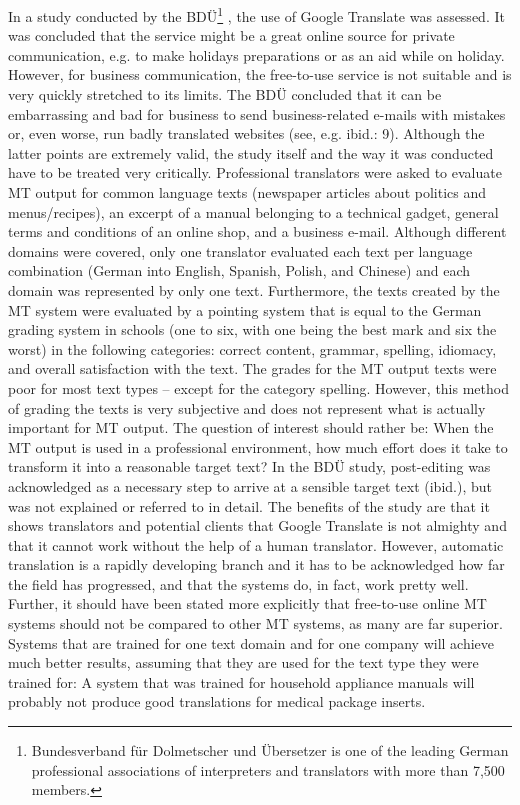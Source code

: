 \documentclass[output=paper]{langsci/langscibook}
\begin{document}
In a study conducted by the BDÜ\footnote{Bundesverband für Dolmetscher und Übersetzer is one of the leading German professional associations of interpreters and translators with more than 7,500 members.} \citep{bdü2012}, the use of Google Translate was assessed. It was concluded that the service might be a great online source for private communication, e.g. to make holidays preparations or as an aid while on holiday. However, for business communication, the free-to-use service is not suitable and is very quickly stretched to its limits. The BDÜ concluded that it can be embarrassing and bad for business to send business-related e\nobreakdash-mails with mistakes or, even worse, run badly translated websites (see, e.g. ibid.: 9). Although the latter points are extremely valid, the study itself and the way it was conducted have to be treated very critically. Professional translators were asked to evaluate MT output for common language texts (newspaper articles about politics and menus/recipes), an excerpt of a manual belonging to a technical gadget, general terms and conditions of an online shop, and a business e\nobreakdash-mail. Although different domains were covered, only one translator evaluated each text per language combination (German into English, Spanish, Polish, and Chinese) and each domain was represented by only one text. Furthermore, the texts created by the MT system were evaluated by a pointing system that is equal to the German grading system in schools (one to six, with one being the best mark and six the worst) in the following categories: correct content, grammar, spelling, idiomacy, and overall satisfaction with the text. The grades for the MT output texts were poor for most text types -- except for the category spelling. However, this method of grading the texts is very subjective and does not represent what is actually important for MT output. The question of interest should rather be: When the MT output is used in a professional environment, how much effort does it take to transform it into a reasonable target text? In the BDÜ study, post-editing was acknowledged as a necessary step to arrive at a sensible target text (ibid.), but was not explained or referred to in detail. The benefits of the study are that it shows translators and potential clients that Google Translate is not almighty and that it cannot work without the help of a human translator. However, automatic translation is a rapidly developing branch and it has to be acknowledged how far the field has progressed, and that the systems do, in fact, work pretty well. Further, it should have been stated more explicitly that free-to-use online MT systems should not be compared to other MT systems, as many are far superior. Systems that are trained for one text domain and for one company will achieve much better results, assuming that they are used for the text type they were trained for: A system that was trained for household appliance manuals will probably not produce good translations for medical package inserts.
\end{document}
